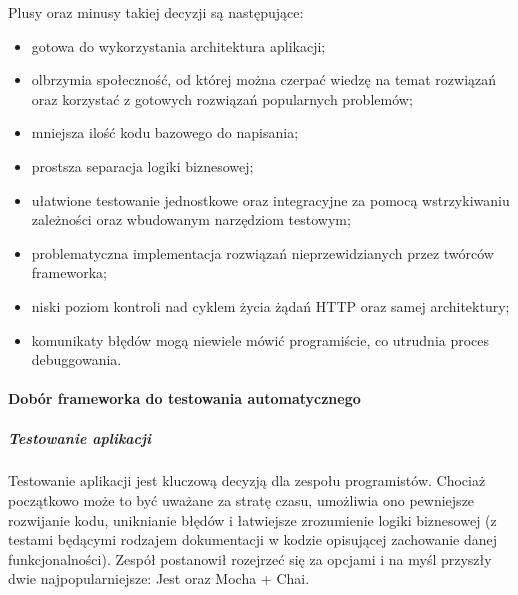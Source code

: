 \documentclass[12pt, a4paper, twoside, openany]{book}
\begin{document}
Plusy oraz minusy takiej decyzji są następujące:

\begin{itemize}
    \item gotowa do wykorzystania architektura aplikacji;
    \item olbrzymia społeczność, od której można czerpać wiedzę na temat rozwiązań 
    oraz korzystać z gotowych rozwiązań popularnych problemów;
    \item mniejsza ilość kodu bazowego do napisania;
    \item prostsza separacja logiki biznesowej;
    \item ułatwione testowanie jednostkowe oraz integracyjne za pomocą wstrzykiwaniu
    zależności oraz wbudowanym narzędziom testowym;
    \item problematyczna implementacja rozwiązań nieprzewidzianych przez twórców
    frameworka;
    \item niski poziom kontroli nad cyklem życia żądań HTTP oraz samej architektury;
    \item komunikaty błędów mogą niewiele mówić programiście, co utrudnia proces debuggowania.
\end{itemize}

\paragraph{Dobór frameworka do testowania automatycznego}
\subparagraph{Testowanie aplikacji\\}

Testowanie aplikacji jest kluczową decyzją dla zespołu programistów.
Chociaż początkowo może to być uważane za stratę czasu, umożliwia ono pewniejsze rozwijanie kodu, uniknianie błędów i łatwiejsze zrozumienie logiki biznesowej (z testami będącymi rodzajem dokumentacji w kodzie opisującej zachowanie danej funkcjonalności).
Zespół postanowił rozejrzeć się za opcjami i na myśl przyszły dwie najpopularniejsze: Jest oraz Mocha + Chai.
\end{document}
